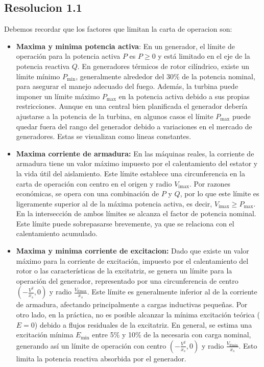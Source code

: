 \documentclass[
  11pt,
  letterpaper,
   addpoints,
   answers
  ]{exam}
\begin{document}
\begin{questions}
\begin{solution}
        \subsection*{Resolucion 1.1}
        Debemos recordar que los factores que limitan la carta de operacion son:
        \begin{itemize}
            \item \textbf{Maxima y minima potencia activa}: En un generador, el límite de operación para la potencia activa \( P \) es \( P \geq 0 \) y está limitado en el eje de la potencia reactiva \( Q \). En generadores térmicos de rotor cilíndrico, existe un límite mínimo \( P_{\text{min}} \), generalmente alrededor del 30\% de la potencia nominal, para asegurar el manejo adecuado del fuego. Además, la turbina puede imponer un límite máximo \( P_{\text{max}} \) en la potencia activa debido a sus propias restricciones. Aunque en una central bien planificada el generador debería ajustarse a la potencia de la turbina, en algunos casos el límite \( P_{\text{max}} \) puede quedar fuera del rango del generador debido a variaciones en el mercado de generadores. Estas se visualizan como lineas constantes.

            \item \textbf{Maxima corriente de armadura:} En las máquinas reales, la corriente de armadura tiene un valor máximo impuesto por el calentamiento del estator y la vida útil del aislamiento. Este límite establece una circunferencia en la carta de operación con centro en el origen y radio \( V_{\text{imax}} \). Por razones económicas, se opera con una combinación de \( P \) y \( Q \), por lo que este límite es ligeramente superior al de la máxima potencia activa, es decir, \( V_{\text{imax}} \geq P_{\text{max}} \). En la intersección de ambos límites se alcanza el factor de potencia nominal. Este límite puede sobrepasarse brevemente, ya que se relaciona con el calentamiento acumulado.

            \item \textbf{Maxima y minima corriente de excitacion:} Dado que existe un valor máximo para la corriente de excitación, impuesto por el calentamiento del rotor o las características de la excitatriz, se genera un límite para la operación del generador, representado por una circunferencia de centro \( \left(-\frac{V^2}{x_s}, 0\right) \) y radio \( \frac{V_{\text{Emax}}}{x_s} \). Este límite es generalmente inferior al de la corriente de armadura, afectando principalmente a cargas inductivas pequeñas. Por otro lado, en la práctica, no es posible alcanzar la mínima excitación teórica (\( E = 0 \)) debido a flujos residuales de la excitatriz. En general, se estima una excitación mínima \( E_{\text{min}} \) entre 5\% y 10\% de la necesaria con carga nominal, generando así un límite de operación con centro \( \left(-\frac{V^2}{x_s}, 0\right) \) y radio \( \frac{V_{\text{Emin}}}{x_s} \). Esto limita la potencia reactiva absorbida por el generador.


\end{itemize}
\end{solution}
\end{questions}
\end{document}

